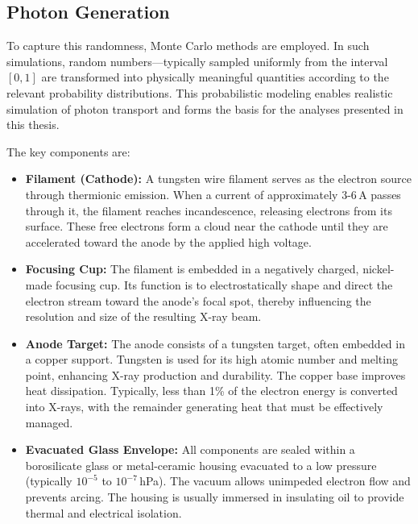 \subsection{Photon Generation}

To capture this randomness, Monte Carlo methods
are employed. In such simulations, random numbers—typically sampled uniformly
from the interval $[0,1]$ are transformed into physically meaningful
quantities according to the relevant probability distributions. This
probabilistic modeling enables realistic simulation of photon transport and
forms the basis for the analyses presented in this thesis.



The key components are:

\begin{itemize}
    \item \textbf{Filament (Cathode):} A tungsten wire filament serves as the
    electron source through thermionic emission. When a current of approximately
    3-6\,A passes through it, the filament reaches incandescence, releasing
    electrons from its surface. These free electrons form a cloud near the
    cathode until they are accelerated toward the anode by the applied high
    voltage.

    \item \textbf{Focusing Cup:} The filament is embedded in a negatively
    charged, nickel-made focusing cup. Its function is to electrostatically
    shape and direct the electron stream toward the anode’s focal spot, thereby
    influencing the resolution and size of the resulting X-ray beam.

    \item \textbf{Anode Target:} The anode consists of a tungsten target, often
    embedded in a copper support. Tungsten is used for its high atomic number
    and melting point, enhancing X-ray production and durability. The copper
    base improves heat dissipation. Typically, less than 1\% of the electron
    energy is converted into X-rays, with the remainder generating heat that
    must be effectively managed.

    \item \textbf{Evacuated Glass Envelope:} All components are sealed within a
    borosilicate glass or metal-ceramic housing evacuated to a low pressure
    (typically $10^{-5}$ to $10^{-7}$\,hPa). The vacuum allows unimpeded
    electron flow and prevents arcing. The housing is usually immersed in
    insulating oil to provide thermal and electrical isolation.
\end{itemize}

